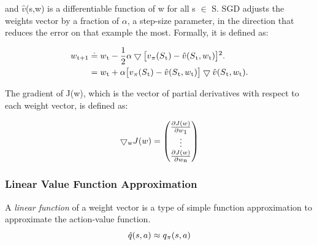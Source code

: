 \documentclass[11pt,twoside]{report}
\theoremstyle{plain}
\theoremstyle{definition}
\begin{document}
and $\hat{v}$(s,w) is a differentiable function of w for all s $\in$ S.
SGD adjusts the weights vector by a fraction of $\alpha$, a step-size parameter,  in the direction that reduces the error on that example the most. Formally, it is defined as:

\begin{equation}\label{eq:sgd}
\begin{split}
w\textsubscript{t+1} & \doteq w\textsubscript{t} -  \frac{1}{2} \alpha  \bigtriangledown \big[ v\textsubscript{$\pi$}(S\textsubscript{t}) - \hat{v}(S\textsubscript{t}, w\textsubscript{t}) \big]\textsuperscript{2}. \\
& = w\textsubscript{t} +  \alpha  \big[ v\textsubscript{$\pi$}(S\textsubscript{t}) - \hat{v}(S\textsubscript{t}, w\textsubscript{t}) \big] \bigtriangledown \hat{v}(S\textsubscript{t}, w\textsubscript{t}).
\end{split}
\end{equation}

The gradient of J(w), which is the vector of partial derivatives with respect to each weight vector,  is defined as:

\begin{equation}
\bigtriangledown\textsubscript{w} J(w) =  \begin{pmatrix} \frac{\partial J(w)}{\partial w\textsubscript{1}}  \\ \vdots \\ \frac{\partial J(w)}{\partial w\textsubscript{n}}   \end{pmatrix}
\end{equation}


\subsubsection{Linear Value Function Approximation}
A \textit{linear function} of a weight vector is a type of simple function approximation to approximate the action-value function. 
\begin{equation}
\hat{q}(s,a) \approx q\textsubscript{$\pi$} (s,a)
\end{equation}
\end{document}
